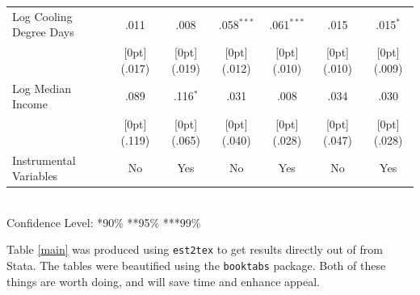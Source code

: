\documentclass[10pt]{article}
\begin{document}
\begin{table}[h!]
\begin{tabular*}{\textwidth}{@{\extracolsep{\fill}}lcccccc}
Log Cooling Degree Days &	.011 &	.008 &	.058$^{***}$ &	.061$^{***}$ &	.015 &	.015$^{*}$ \\
&	\raisebox{.7ex}[0pt]{\scriptsize (.017)} &	\raisebox{.7ex}[0pt]{\scriptsize (.019)} &	\raisebox{.7ex}[0pt]{\scriptsize (.012)} &	\raisebox{.7ex}[0pt]{\scriptsize (.010)} &	\raisebox{.7ex}[0pt]{\scriptsize (.010)} &	\raisebox{.7ex}[0pt]{\scriptsize (.009)} \\
Log Median Income &	.089 &	.116$^{*}$ &	.031 &	.008 &	.034 &	.030 \\
&	\raisebox{.7ex}[0pt]{\scriptsize (.119)} &	\raisebox{.7ex}[0pt]{\scriptsize (.065)} &	\raisebox{.7ex}[0pt]{\scriptsize (.040)} &	\raisebox{.7ex}[0pt]{\scriptsize (.028)} &	\raisebox{.7ex}[0pt]{\scriptsize (.047)} &	\raisebox{.7ex}[0pt]{\scriptsize (.028)} \\
\midrule
Instrumental Variables & No & Yes &No&Yes&No&Yes\\
\bottomrule		
\end{tabular*}%
\\Confidence Level: *90\% **95\% ***99\%	
\end{table}

Table \ref{main} was produced using \texttt{est2tex} to get results directly out of from Stata.  The tables were beautified using the \texttt{booktabs} package.  Both of these things are worth doing, and will save time and enhance appeal.



\end{document}
